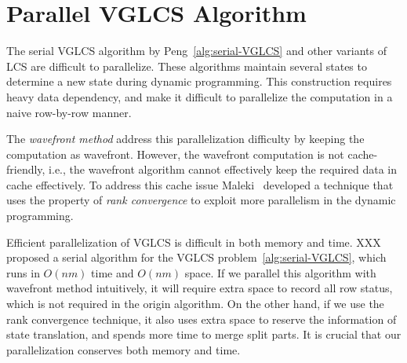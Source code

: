 \section{Parallel VGLCS Algorithm} %
\label{sec:parallelVGLCS}

The serial VGLCS algorithm by Peng~\ref{alg:serial-VGLCS} and other
variants of LCS are difficult to parallelize.  These algorithms
maintain several states to determine a new state during dynamic
programming.  This construction requires heavy data dependency, and
make it difficult to parallelize the computation in a naive row-by-row
manner.

The {\em wavefront method} address this parallelization difficulty by
keeping the computation as wavefront.  However, the wavefront
computation is not cache-friendly, i.e., the wavefront algorithm
cannot effectively keep the required data in cache effectively.  To
address this cache issue Maleki~\cite{Maleki2016EfficientPU} developed
a technique that uses the property of {\em rank convergence} to
exploit more parallelism in the dynamic programming.  %

\iffalse
在 $O(nm \alpha(n))$ 的序列算法 \ref{alg:serial-VGLCS} 中，
我們發現算法如大多數的變型 LCS 相同，依賴數個狀態以轉移當前狀態，
大量的資料依賴性不易於細粒度平行。使用波前運行平行是一種常見的解決方案，
由於這種平行對於運行時的快取不友善 (cache-unfriendly)，
在 Saeed Maleki ~\cite{saeed} 論文中提到如何使用 Rank Convergence 的特殊性質，
拓展出更高平行度來解決動態規劃的相關問題。
\fi




Efficient parallelization of VGLCS is difficult in both memory and
time.  XXX proposed a serial algorithm for the VGLCS
problem~\ref{alg:serial-VGLCS}, which runs in $O(nm)$ time and $O(nm)$
space.  If we parallel this algorithm with wavefront method
intuitively, it will require extra space to record all row status,
which is not required in the origin algorithm.  On the other hand, if
we use the rank convergence technique, it also uses extra space to
reserve the information of state translation, and spends more time to
merge split parts.  It is crucial that our parallelization conserves
both memory and time.

\iffalse 序列算法的空間複雜度為 $O(nm)$。若使用波前平行，需要同時維護橫
向的所有狀態，需要多付出一倍的空間量。若加入 Rank Convergence 的想法拓
展出，勢必要記錄轉移的狀態，需要耗費更多的記憶體空間，用以在最後階段合
併所用。\fi

